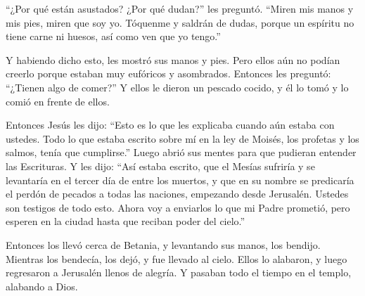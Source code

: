  ``¿Por qué están asustados? ¿Por qué dudan?'' les
preguntó.  ``Miren mis manos y mis pies, miren que soy yo.
Tóquenme y saldrán de dudas, porque un espíritu no tiene carne ni
huesos, así como ven que yo tengo.''

 Y habiendo dicho esto, les mostró sus manos y pies.
 Pero ellos aún no podían creerlo porque estaban muy
eufóricos y asombrados. Entonces les preguntó: ``¿Tienen algo de
comer?''  Y ellos le dieron un pescado cocido,
 y él lo tomó y lo comió en frente de ellos.

 Entonces Jesús les dijo: ``Esto es lo que les explicaba
cuando aún estaba con ustedes. Todo lo que estaba escrito sobre mí en la
ley de Moisés, los profetas y los salmos, tenía que cumplirse.''
 Luego abrió sus mentes para que pudieran entender las
Escrituras.  Y les dijo: ``Así estaba escrito, que el
Mesías sufriría y se levantaría en el tercer día de entre los muertos, y
que en su nombre  se predicaría el perdón de pecados a
todas las naciones, empezando desde Jerusalén.  Ustedes son
testigos de todo esto.  Ahora voy a enviarlos lo que mi
Padre prometió, pero esperen en la ciudad hasta que reciban poder del
cielo.''

 Entonces los llevó cerca de Betania, y levantando sus
manos, los bendijo.  Mientras los bendecía, los dejó, y fue
llevado al cielo.  Ellos lo alabaron, y luego regresaron a
Jerusalén llenos de alegría.  Y pasaban todo el tiempo en
el templo, alabando a Dios.
